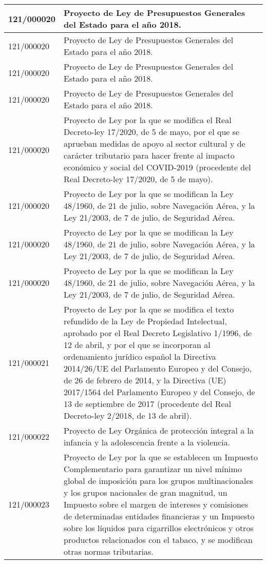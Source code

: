 {\begin{table}[H]
\begin{center}
\begin{tabularx}{\linewidth}{| l | X |}
\hline
121/000020 & Proyecto de Ley de Presupuestos Generales del Estado para el año 2018. \\
\hline
121/000020 & Proyecto de Ley de Presupuestos Generales del Estado para el año 2018. \\
\hline
121/000020 & Proyecto de Ley de Presupuestos Generales del Estado para el año 2018. \\
\hline
121/000020 & Proyecto de Ley de Presupuestos Generales del Estado para el año 2018. \\
\hline
121/000020 & Proyecto de Ley por la que se modifica el Real Decreto-ley 17/2020, de 5 de mayo, por el que se aprueban medidas de apoyo al sector cultural y de carácter tributario para hacer frente al impacto económico y social del COVID-2019 (procedente del Real Decreto-ley 17/2020, de 5 de mayo). \\
\hline
121/000020 & Proyecto de Ley por la que se modifican la Ley 48/1960, de 21 de julio, sobre Navegación Aérea, y la Ley 21/2003, de 7 de julio, de Seguridad Aérea. \\
\hline
121/000020 & Proyecto de Ley por la que se modifican la Ley 48/1960, de 21 de julio, sobre Navegación Aérea, y la Ley 21/2003, de 7 de julio, de Seguridad Aérea. \\
\hline
121/000020 & Proyecto de Ley por la que se modifican la Ley 48/1960, de 21 de julio, sobre Navegación Aérea, y la Ley 21/2003, de 7 de julio, de Seguridad Aérea. \\
\hline
121/000021 & Proyecto de Ley por la que se modifica el texto refundido de la Ley de Propiedad Intelectual, aprobado por el Real Decreto Legislativo 1/1996, de 12 de abril, y por el que se incorporan al ordenamiento jurídico español la Directiva 2014/26/UE del Parlamento Europeo y del Consejo, de 26 de febrero de 2014, y la Directiva (UE) 2017/1564 del Parlamento Europeo y del Consejo, de 13 de septiembre de 2017 (procedente del Real Decreto-ley 2/2018, de 13 de abril). \\
\hline
121/000022 & Proyecto de Ley Orgánica de protección integral a la infancia y la adolescencia frente a la violencia. \\
\hline
121/000023 & Proyecto de Ley por la que se establecen un Impuesto Complementario para garantizar un nivel mínimo global de imposición para los grupos multinacionales y los grupos nacionales de gran magnitud, un Impuesto sobre el margen de intereses y comisiones de determinadas entidades financieras y un Impuesto sobre los líquidos para cigarrillos electrónicos y otros productos relacionados con el tabaco, y se modifican otras normas tributarias. \\

\end{tabularx}
\end{center}
\end{table}}
